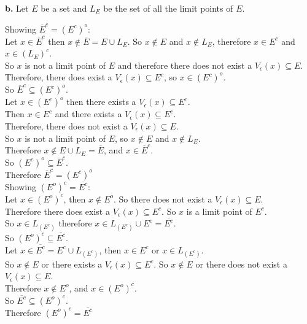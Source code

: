 \documentclass{article}
\begin{document}
{\Large \textbf{b.}} Let $E$ be a set and $L_E$ be the set of all the limit points of $E$.
\begin{center}
    \doublespacing
    Showing $\overline{E} ^c = (E^c)^o$:
    \\Let $x\in\overline{E} ^c$ then $x\notin\overline{E} = E\cup L_E$. So $x\notin E$ and $x\notin L_E$, therefore $x\in E^c$ and $x\in (L_E)^c$.
    \\So $x$ is not a limit point of $E$ and therefore there does not exist a $V_{\epsilon} (x)\subseteq E$.
    \\Therefore, there does exist a $V_{\epsilon} (x)\subseteq E^c$, so $x\in (E^c)^o$.
    \\So $\overline{E} ^c\subseteq (E^c)^o$.
    \\Let $x\in (E^c)^o$ then there exists a $V_{\epsilon} (x)\subseteq E^c$.
    \\Then $x\in E^c$ and there exists a $V_{\epsilon} (x)\subseteq E^c$.
    \\Therefore, there does not exist a $V_{\epsilon} (x)\subseteq E$.
    \\So $x$ is not a limit point of $E$, so $x\notin E$ and $x\notin L_E$.
    \\Therefore $x\notin E\cup L_E =\overline{E}$, and $x\in\overline{E} ^c$.
    \\So $(E^c)^o\subseteq\overline{E} ^c$.
    \\Therefore $\overline{E} ^c = (E^c)^o$ \qedsymbol
    \\Showing $(E^o)^c = \overline{E^c}$:
    \\Let $x\in (E^o)^c$, then $x\notin E^o$. So there does not exist a $V_{\epsilon} (x)\subseteq E$.
    \\Therefore there does exist a $V_{\epsilon} (x)\subseteq E^c$. So $x$ is a limit point of $E^c$.
    \\So $x\in L_{(E^c)}$ therefore $x\in L_{(E^c)}\cup E^c = \overline{E^c}$.
    \\So $(E^o)^c\subseteq\overline{E^c}$.
    \\Let $x\in\overline{E^c} = E^c\cup L_{(E^c)}$, then $x\in E^c$ or $x\in L_{(E^c)}$.
    \\So $x\notin E$ or there exists a $V_{\epsilon} (x)\subseteq E^c$. So $x\notin E$ or there does not exist a $V_{\epsilon} (x)\subseteq E$.
    \\Therefore $x\notin E^o$, and $x\in (E^o)^c$.
    \\So $\overline{E^c}\subseteq (E^o)^c$.
    \\Therefore $(E^o)^c = \overline{E^c}$ \qedsymbol
\end{center}
\end{document}
